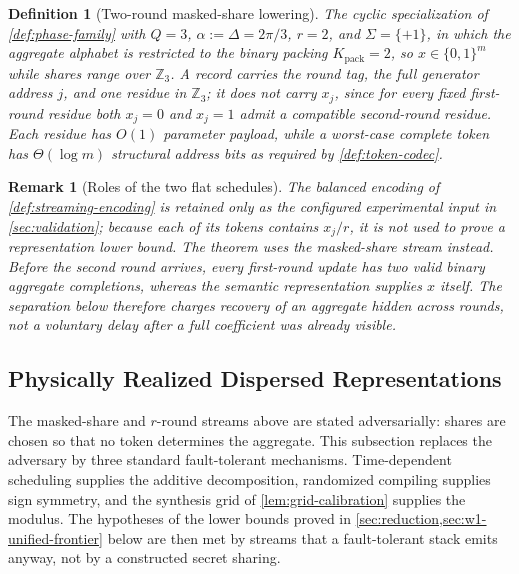 \documentclass[a4paper,twocolumn,10pt,unpublished]{quantumarticle}
\newtheorem{definition}{Definition}
\newtheorem{remark}{Remark}
\begin{document}
\begin{definition}[Two-round masked-share lowering]
\label{def:masked-share}
The cyclic specialization of \cref{def:phase-family} with $Q=3$,
$\alpha:=\Delta=2\pi/3$, $r=2$, and $\Sigma=\{+1\}$, in which the
aggregate alphabet is restricted to the binary packing
$K_{\mathrm{pack}}=2$, so $x\in\{0,1\}^m$ while shares range over
$\mathbb Z_3$.  A record carries the round tag, the full generator
address $j$, and one residue in $\mathbb Z_3$; it does not carry $x_j$,
since for every fixed first-round residue both $x_j=0$ and $x_j=1$ admit
a compatible second-round residue.  Each residue has $O(1)$ parameter
payload, while a worst-case complete token has $\Theta(\log m)$
structural address bits as required by \cref{def:token-codec}.
\end{definition}

\begin{remark}[Roles of the two flat schedules]
\label{rem:dispersal}
The balanced encoding of \cref{def:streaming-encoding} is retained only as
the configured experimental input in \cref{sec:validation}; because each
of its tokens contains $x_j/r$, it is not used to prove a representation
lower bound.  The theorem uses the masked-share stream instead.  Before the
second round arrives, every first-round update has two valid binary
aggregate completions, whereas the semantic representation supplies $x$
itself.  The separation below therefore charges recovery of an aggregate
hidden across rounds, not a voluntary delay after a full coefficient was
already visible.
\end{remark}

\subsection{Physically Realized Dispersed Representations}
\label{sec:physical-dispersed}

The masked-share and $r$-round streams above are stated adversarially:
shares are chosen so that no token determines the aggregate.  This
subsection replaces the adversary by three standard fault-tolerant
mechanisms.  Time-dependent scheduling supplies the additive
decomposition, randomized compiling supplies sign symmetry, and the
synthesis grid of \cref{lem:grid-calibration} supplies the modulus.  The
hypotheses of the lower bounds proved in
\cref{sec:reduction,sec:w1-unified-frontier} below are then met by
streams that a fault-tolerant stack emits anyway, not by a constructed
secret sharing.
\end{document}
